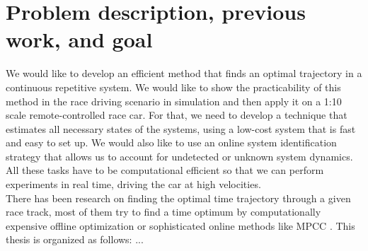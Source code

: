 \section{Problem description, previous work, and goal}
We would like to develop an efficient method that finds an optimal trajectory in a continuous repetitive system. We would like to show the practicability of this method in the race driving scenario in simulation and then apply it on a 1:10 scale remote-controlled race car. For that, we need to develop a technique that estimates all necessary states of the systems, using a low-cost system that is fast and easy to set up. We would also like to use an online system identification strategy that allows us to account for undetected or unknown system dynamics. All these tasks have to be computational efficient so that we can perform experiments in real time, driving the car at high velocities.\\
There has been research on finding the optimal time trajectory through a given race track, most of them try to find a time optimum by computationally expensive offline optimization or sophisticated online methods like MPCC \cite{Liniger2015}.
This thesis is organized as follows: ...
